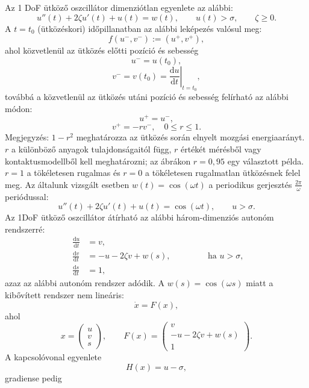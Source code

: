 Az 1 DoF ütköző oszcillátor dimenziótlan egyenlete az alábbi:
\begin{equation}
u''(t)+2\zeta u'(t)+u(t)=w(t),\qquad u(t)>\sigma,\qquad \zeta\geq0.
\end{equation}
A $t=t_0$ (ütközéskori) időpillanatban az alábbi leképezés valósul meg:
\begin{equation}
f(u^-,v^-):=(u^+,v^+),
\end{equation}
ahol közvetlenül az ütközés előtti pozíció és sebesség
\begin{equation}
u^-=u(t_0),
\end{equation}
\begin{equation}
v^-=v(t_0)=\left.\frac{\mathrm{d}u}{\mathrm{d}t}\right|_{t=t_0},
\end{equation}
továbbá a közvetlenül az ütközés utáni pozíció és sebesség felírható az alábbi módon:
\begin{equation}
u^+=u^-,
\end{equation}
\begin{equation}
v^+=-rv^-, \quad 0\le r\le 1.
\end{equation}
Megjegyzés: $1-r^2$ meghatározza az ütközés során elnyelt mozgási energiaarányt. $r$ a különböző anyagok tulajdonságaitól függ, $r$ értékét mérésből vagy kontaktusmodellből kell meghatározni; az ábrákon $r=0{,}95$ egy választott példa. $r=1$ a tökéletesen rugalmas és $r=0$ a tökéletesen rugalmatlan ütközésnek felel meg. Az általunk vizsgált esetben $w(t)=\cos(\omega t)$ a periodikus gerjesztés $\frac{2\pi}{\omega}$ periódussal:
\begin{equation}
u''(t)+2\zeta u'(t)+u(t)=\cos(\omega t),\qquad u>\sigma.
\end{equation}
Az 1DoF ütköző oszcillátor átírható az alábbi három-dimenziós autonóm rendszerré:
\begin{equation}
\begin{split}
\frac{\mathrm{d}u}{\mathrm{d}t}&=v,\\
\frac{\mathrm{d}v}{\mathrm{d}t}&=-u-2\zeta v+w(s),\\
\frac{\mathrm{d}s}{\mathrm{d}t}&=1,
\end{split}\qquad \qquad \text{ha } u>\sigma,
\end{equation}
azaz az alábbi autonóm rendszer adódik. A $w(s)=\cos(\omega s)$ miatt a kibővített rendszer nem lineáris:
\begin{equation}
\dot{x}=F(x),
\end{equation}
ahol
\begin{equation}\label{eq:xFx}
x=\begin{pmatrix}
u\\ v\\ s
\end{pmatrix},\qquad
F(x)=\begin{pmatrix}
v\\
-u-2\zeta v+w(s)\\
1
\end{pmatrix}.
\end{equation}
A kapcsolóvonal egyenlete
\begin{equation}
H(x)=u-\sigma,
\end{equation}
gradiense pedig


